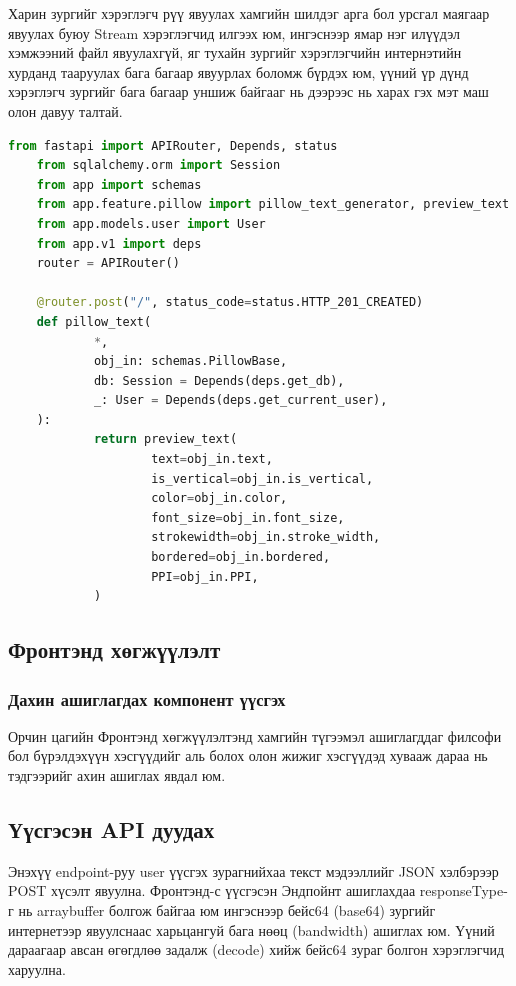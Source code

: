 Харин зургийг хэрэглэгч рүү явуулах хамгийн шилдэг арга бол урсгал маягаар явуулах буюу Stream хэрэглэгчид илгээх юм, ингэснээр ямар нэг илүүдэл хэмжээний файл явуулахгүй, яг тухайн зургийг хэрэглэгчийн интернэтийн хурданд тааруулах бага багаар явуурлах боломж бүрдэх юм, үүний үр дүнд хэрэглэгч зургийг бага багаар уншиж байгааг нь дээрээс нь харах гэх мэт маш олон давуу талтай.
\begin{lstlisting}[language=Python,caption={Зураг буцаан user-лүү илгээх endpoint},frame=single]
	from fastapi import APIRouter, Depends, status
	from sqlalchemy.orm import Session
	from app import schemas
	from app.feature.pillow import pillow_text_generator, preview_text
	from app.models.user import User
	from app.v1 import deps
	router = APIRouter()

	@router.post("/", status_code=status.HTTP_201_CREATED)
	def pillow_text(
			*,
			obj_in: schemas.PillowBase,
			db: Session = Depends(deps.get_db),
			_: User = Depends(deps.get_current_user),
	):
			return preview_text(
					text=obj_in.text,
					is_vertical=obj_in.is_vertical,
					color=obj_in.color,
					font_size=obj_in.font_size,
					strokewidth=obj_in.stroke_width,
					bordered=obj_in.bordered,
					PPI=obj_in.PPI,
			)
	\end{lstlisting}

\subsection{Фронтэнд хөгжүүлэлт}
\subsubsection{Дахин ашиглагдах компонент үүсгэх}
Орчин цагийн Фронтэнд хөгжүүлэлтэнд хамгийн түгээмэл ашиглагддаг филсофи бол бүрэлдэхүүн хэсгүүдийг аль болох олон жижиг хэсгүүдэд хувааж дараа нь тэдгээрийг ахин ашиглах явдал юм.

\subsection{Үүсгэсэн API дуудах}
Энэхүү endpoint-руу user үүсгэх зурагнийхаа текст мэдээллийг JSON хэлбэрээр POST хүсэлт явуулна. Фронтэнд-с үүсгэсэн Эндпойнт ашиглахдаа responseType-г нь arraybuffer болгож байгаа юм ингэснээр бейс64 (base64) зургийг интернетээр явуулснаас харьцангуй бага нөөц (bandwidth) ашиглах юм. Үүний дараагаар авсан өгөгдлөө задалж (decode) хийж бейс64 зураг болгон хэрэглэгчид харуулна.



